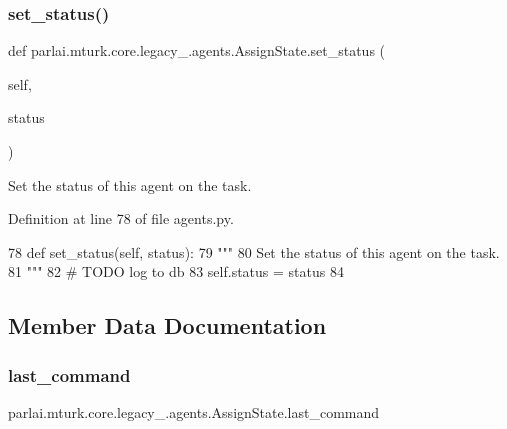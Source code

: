 \subsubsection{\texorpdfstring{set\+\_\+status()}{set\_status()}}
{\footnotesize\ttfamily def parlai.\+mturk.\+core.\+legacy\+\_.\+agents.\+Assign\+State.\+set\+\_\+status (\begin{DoxyParamCaption}\item[{}]{self,  }\item[{}]{status }\end{DoxyParamCaption})}

\begin{DoxyVerb}Set the status of this agent on the task.
\end{DoxyVerb}
 

Definition at line 78 of file agents.\+py.


\begin{DoxyCode}
78     \textcolor{keyword}{def }set\_status(self, status):
79         \textcolor{stringliteral}{"""}
80 \textcolor{stringliteral}{        Set the status of this agent on the task.}
81 \textcolor{stringliteral}{        """}
82         \textcolor{comment}{# TODO log to db}
83         self.status = status
84 
\end{DoxyCode}


\subsection{Member Data Documentation}
\mbox{\label{classparlai_1_1mturk_1_1core_1_1legacy__2018_1_1agents_1_1AssignState_a6b14225b614a29376d4d92ba03069780}} 
\subsubsection{\texorpdfstring{last\+\_\+command}{last\_command}}
{\footnotesize\ttfamily parlai.\+mturk.\+core.\+legacy\+\_.\+agents.\+Assign\+State.\+last\+\_\+command}



